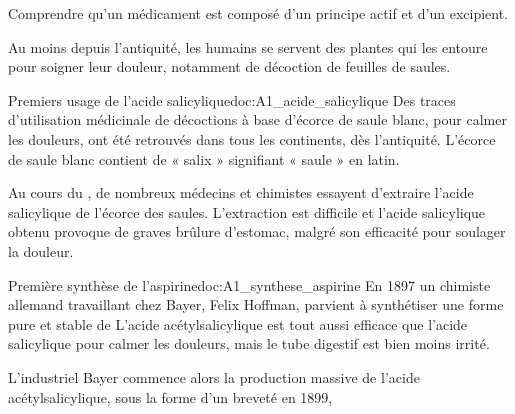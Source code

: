\teteTermStssMedi


\begin{objectifs}
  \item Comprendre qu'un médicament est composé d'un principe actif et d'un excipient.
\end{objectifs}

\begin{contexte}
  Au moins depuis l'antiquité, les humains se servent des plantes qui les entoure pour soigner leur douleur, notamment de décoction de feuilles de saules.
  
\end{contexte}


\begin{doc}{Premiers usage de l'acide salicylique}{doc:A1_acide_salicylique}
  Des traces d'utilisation médicinale de décoctions à base d'écorce de saule blanc, pour calmer les douleurs, ont été retrouvés dans tous les continents, dès l'antiquité.
  L'écorce de saule blanc contient de  « salix » signifiant « saule » en latin.

  Au cours du \!, de nombreux médecins et chimistes essayent d'extraire l'acide salicylique de l'écorce des saules. 
  L'extraction est difficile et l'acide salicylique obtenu provoque de graves brûlure d'estomac, malgré son efficacité pour soulager la douleur.
\end{doc}

\begin{doc}{Première synthèse de l'aspirine}{doc:A1_synthese_aspirine}
  En 1897 un chimiste allemand travaillant chez Bayer, Felix Hoffman, parvient à synthétiser une forme pure et stable de
  L'acide acétylsalicylique est tout aussi efficace que l'acide salicylique pour calmer les douleurs, mais le tube digestif est bien moins irrité.

  L'industriel Bayer commence alors la production massive de l'acide acétylsalicylique, sous la forme d'un  breveté en 1899, 
\end{doc}

